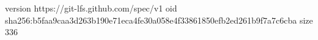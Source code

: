 version https://git-lfs.github.com/spec/v1
oid sha256:b5faa9caa3d263b190e71eca4fe30a058e4f33861850efb2ed261b9f7a7c6cba
size 336
